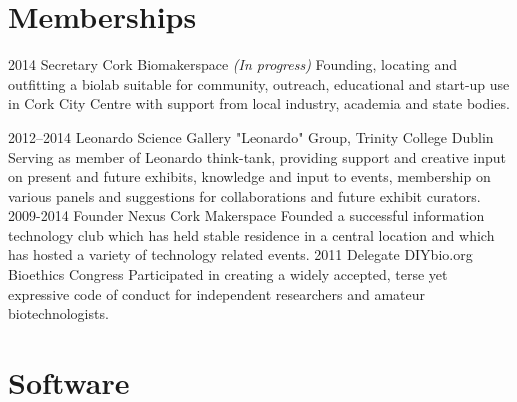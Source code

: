\documentclass[]{friggeri-cv} %
\begin{document}
\pagebreak

\section{Memberships}

\begin{entrylist}
\entry
{2014}
{Secretary}
{Cork Biomakerspace}
{\emph{(In progress)} Founding, locating and outfitting a biolab suitable for
community, outreach, educational and start-up use in Cork City Centre with support
from local industry, academia and state bodies.
}

\entry
{2012--2014}
{Leonardo}
{Science Gallery "Leonardo" Group, Trinity College Dublin}
{Serving as member of Leonardo think-tank, providing support and creative input on
present and future exhibits, knowledge and input to events, membership on various
panels and suggestions for collaborations and future exhibit curators.
}
\entry
{2009-2014}
{Founder}
{Nexus Cork Makerspace}
{Founded a successful information technology club which has held stable residence
in a central location and which has hosted a variety of technology related events.
}
\entry
{2011}
{Delegate}
{DIYbio.org Bioethics Congress}
{Participated in creating a widely accepted, terse yet expressive code of conduct
for independent researchers and amateur biotechnologists.
}
\end{entrylist}


\section{Software}
\end{document}
